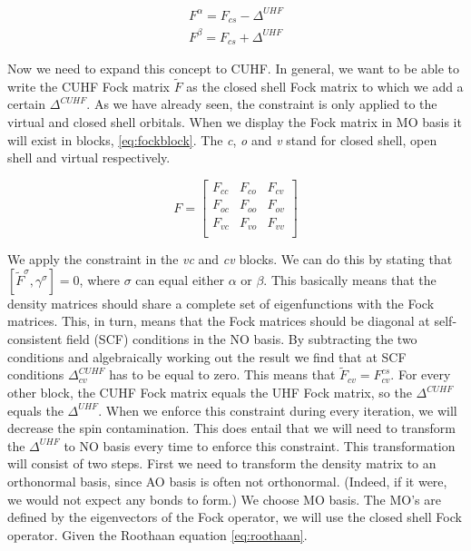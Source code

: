 \documentclass[twoside,twocolumn,9pt]{article}
\begin{document}
\begin{subequations}
  \begin{align}
    \label{eq:uhfa}
    F^\alpha = F_{cs} - \Delta^{UHF} \\
    \label{eq:uhfb}
    F^\beta = F_{cs} + \Delta^{UHF}
  \end{align}
\end{subequations}

Now we need to expand this concept to CUHF. In general, we want
to be able to write the CUHF Fock matrix $\tilde{F}$ as the closed shell Fock matrix to which we add a certain $\Delta^{CUHF}$. As we have already seen, the constraint is only
applied to the virtual and closed shell orbitals. When we display the Fock matrix in MO basis it will exist in blocks, \eqref{eq:fockblock}. The \textit{c}, \textit{o} and \textit{v}
stand for closed shell, open shell and virtual respectively.

\begin{equation}\label{eq:fockblock}
  F = \begin{bmatrix}
    F_{cc} & F_{co} & F_{cv} \\
    F_{oc} & F_{oo} & F_{ov} \\
    F_{vc} & F_{vo} & F_{vv} \\
  \end{bmatrix}
\end{equation}

We apply the constraint in the \textit{vc} and \textit{cv} blocks. We can do this by stating that $[\tilde{F}^\sigma, \gamma^\sigma] = 0$, where $\sigma$ can equal either $\alpha$
or $\beta$. This basically means that the density matrices should share a complete set of eigenfunctions with the Fock matrices. This, in turn, means that the Fock matrices should be
diagonal at self-consistent field (SCF) conditions in the NO basis. By subtracting the two conditions and algebraically working out the result we find that at SCF conditions
$\Delta^{CUHF}_{cv}$ has to be equal to zero. This means that $\tilde{F}_{cv} = F_{cv}^{cs}$\cite{Scuseria2010}. For every other block, the CUHF Fock matrix equals the UHF Fock matrix,
so the $\Delta^{CUHF}$ equals the $\Delta^{UHF}$. When we enforce this constraint during every iteration, we will decrease the spin contamination. This does entail that we will need
to transform the $\Delta^{UHF}$ to NO basis every time to enforce this constraint. This transformation will consist of two steps. First we need to transform the density matrix to
an orthonormal basis, since AO basis is often not orthonormal. (Indeed, if it were, we would not expect any bonds to form.) We choose MO basis. The MO's are defined by the
eigenvectors of the Fock operator, we will use the closed shell Fock operator. Given the Roothaan equation \eqref{eq:roothaan}.
\end{document}

